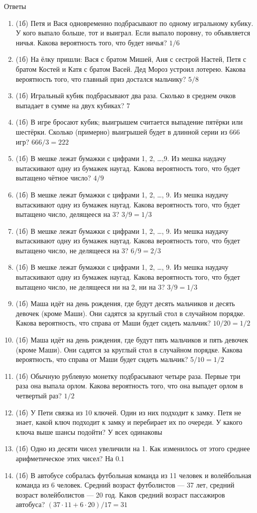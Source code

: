 \documentclass[a4paper, 12pt]{article}
\begin{document}
\newpage
Ответы
\begin{enumerate}
\item (1б) Петя и Вася одновременно подбрасывают по одному игральному кубику. У кого выпало больше, тот и выиграл. Если выпало поровну, то объявляется ничья. Какова вероятность того, что будет ничья? $1/6$
\item (1б) На ёлку пришли: Вася с братом Мишей, Аня с сестрой Настей, Петя с братом Костей и Катя с братом Васей. Дед Мороз устроил лотерею. Какова вероятность того, что главный приз достался мальчику? $5/8$
\item (1б) Игральный кубик подбрасывают два раза. Сколько в среднем очков выпадает в сумме на двух кубиках? $7$
\item (1б) В игре бросают кубик; выигрышем считается выпадение пятёрки или шестёрки. Сколько (примерно) выигрышей будет в длинной серии из 666 игр? $666/3=222$
\item (1б) В мешке лежат бумажки с цифрами 1, 2, \ldots ,9. Из мешка наудачу вытаскивают одну из бумажек наугад. Какова вероятность того, что будет вытащено чётное число? $4/9$
\item (1б) В мешке лежат бумажки с цифрами 1, 2, \ldots, 9. Из мешка наудачу вытаскивают одну из бумажек наугад. Какова вероятность того, что будет вытащено число, делящееся на 3? $3/9=1/3$
\item (1б) В мешке лежат бумажки с цифрами 1, 2, \ldots, 9. Из мешка наудачу вытаскивают одну из бумажек наугад. Какова вероятность того, что будет вытащено число, не делящееся на 3? $6/9=2/3$
\item (1б) В мешке лежат бумажки с цифрами 1, 2, \ldots, 9. Из мешка наудачу вытаскивают одну из бумажек наугад. Какова вероятность того, что будет вытащено число, не делящееся ни на 2, ни на 3? $3/9=1/3$
\item (1б) Маша идёт на день рождения, где будут десять мальчиков и десять девочек (кроме Маши). Они садятся за круглый стол в случайном порядке. Какова вероятность, что справа от Маши будет сидеть мальчик? $10/20=1/2$
\item (1б) Маша идёт на день рождения, где будут пять мальчиков и пять девочек (кроме Маши). Они садятся за круглый стол в случайном порядке. Какова вероятность, что справа от Маши будет сидеть мальчик? $5/10=1/2$
\item (1б) Обычную рублевую монетку подбрасывают четыре раза. Первые три раза она выпала орлом. Какова вероятность того, что она выпадет орлом в четвертый раз? $1/2$
\item (1б) У Пети связка из 10 ключей. Один из них подходит к замку. Петя не знает, какой ключ подходит к замку и перебирает их по очереди. У какого ключа выше шансы подойти? У всех одинаковы
\item (1б) Одно из десяти чисел увеличили на 1. Как изменилось от этого среднее арифметическое этих чисел? На $0.1$
\item (1б) В автобусе собралась футбольная команда из 11 человек и волейбольная команда из 6 человек. Средний возраст футболистов — 37 лет, средний возраст волейболистов — 20 год. Каков средний возраст пассажиров автобуса? $(37 \cdot 11 + 6 \cdot 20)/17=31$
\end{enumerate}
\end{document}
